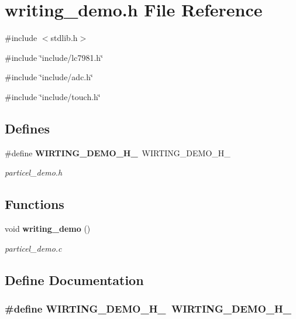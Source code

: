 \section{writing\_\-demo.h File Reference}
\label{writing__demo_8h}
{\ttfamily \#include $<$stdlib.h$>$}\par
{\ttfamily \#include \char`\"{}include/lc7981.h\char`\"{}}\par
{\ttfamily \#include \char`\"{}include/adc.h\char`\"{}}\par
{\ttfamily \#include \char`\"{}include/touch.h\char`\"{}}\par
\subsection*{Defines}
\begin{DoxyCompactItemize}
\item 
\#define {\bf WIRTING\_\-DEMO\_\-H\_\-}~WIRTING\_\-DEMO\_\-H\_\-
\begin{DoxyCompactList}\small\item\em particel\_\-demo.h \item\end{DoxyCompactList}\end{DoxyCompactItemize}
\subsection*{Functions}
\begin{DoxyCompactItemize}
\item 
void {\bf writing\_\-demo} ()
\begin{DoxyCompactList}\small\item\em particel\_\-demo.c \item\end{DoxyCompactList}\end{DoxyCompactItemize}


\subsection{Define Documentation}
\subsubsection[{WIRTING\_\-DEMO\_\-H\_\-}]{\setlength{\rightskip}{0pt plus 5cm}\#define WIRTING\_\-DEMO\_\-H\_\-~WIRTING\_\-DEMO\_\-H\_\-}\label{writing__demo_8h_a69a65c026c8b8e97c7b6f99de76ab00d}


